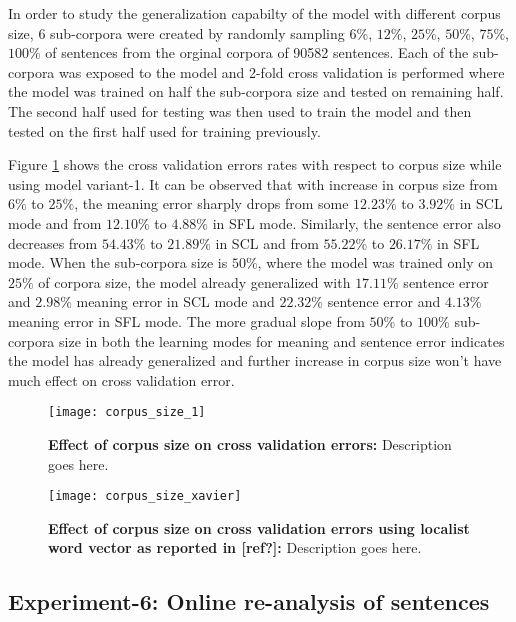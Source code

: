 In order to study the generalization capabilty of the model with different corpus size,  6 sub-corpora were created by randomly sampling $6\%$, $12\%$, $25\%$, $50\%$, $75\%$, $100\%$ of sentences from the orginal corpora of 90582 sentences\cite{end-to-end}. Each of the sub-corpora was exposed to the model and 2-fold cross validation is performed where the model was trained on half the sub-corpora size and tested on remaining half. The second half used for testing was then used to train the model and then tested on the first half used for training previously.

Figure \ref{fig:corpus_size_1} shows the cross validation errors rates with respect to corpus size while using model variant-1. It can be observed that with increase in corpus size from $6 \%$  to $25 \%$, the meaning error sharply drops from some $12.23 \%$ to $3.92 \%$ in SCL mode and from $12.10\%$ to $4.88 \%$ in SFL mode. Similarly, the sentence error also decreases from $54.43 \%$ to $21.89 \%$ in SCL and from $55.22 \%$ to $26.17 \%$ in SFL mode. When the sub-corpora size is $50\%$, where the model was trained only on $25\%$ of corpora size, the model already generalized with $17.11 \%$ sentence error and $2.98 \%$ meaning error in SCL mode and  $22.32 \%$ sentence error and $4.13 \%$ meaning error in SFL mode. The more gradual slope from $50 \%$ to $100 \%$ sub-corpora size in both the learning modes for meaning and sentence error indicates the model has already generalized and further increase in corpus size won’t have much effect on cross validation error.
 

\begin{figure}[hbtp]
\centering
\texttt{[image: corpus\_size\_1]}
\caption{\textbf{Effect of corpus size on cross validation errors:} Description goes here.}
\label{fig:corpus_size_1}
\end{figure}


\begin{figure}[hbtp]
\centering
\texttt{[image: corpus\_size\_xavier]}
\caption{\textbf{Effect of corpus size on cross validation errors using localist word vector as reported in [ref?]:} Description goes here.}
\label{fig:corpus_size_xavier}
\end{figure}


\newpage

\subsection{Experiment-6: Online re-analysis of sentences}

